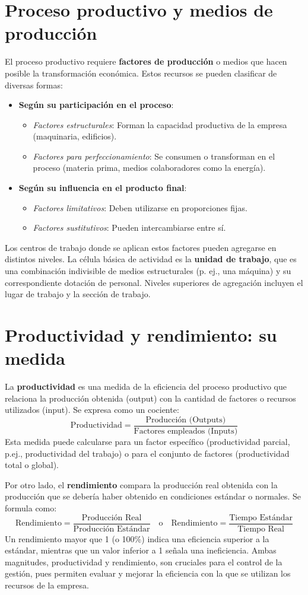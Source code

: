 \section{Proceso productivo y medios de producción}
El proceso productivo requiere \textbf{factores de producción} o medios que hacen posible la transformación económica. Estos recursos se pueden clasificar de diversas formas:
\begin{itemize}
    \item \textbf{Según su participación en el proceso}:
        \begin{itemize}
            \item \textit{Factores estructurales}: Forman la capacidad productiva de la empresa (maquinaria, edificios).
            \item \textit{Factores para perfeccionamiento}: Se consumen o transforman en el proceso (materia prima, medios colaboradores como la energía).
        \end{itemize}
    \item \textbf{Según su influencia en el producto final}:
        \begin{itemize}
            \item \textit{Factores limitativos}: Deben utilizarse en proporciones fijas.
            \item \textit{Factores sustitutivos}: Pueden intercambiarse entre sí.
        \end{itemize}
\end{itemize}
Los centros de trabajo donde se aplican estos factores pueden agregarse en distintos niveles. La célula básica de actividad es la \textbf{unidad de trabajo}, que es una combinación indivisible de medios estructurales (p. ej., una máquina) y su correspondiente dotación de personal. Niveles superiores de agregación incluyen el lugar de trabajo y la sección de trabajo.

\section{Productividad y rendimiento: su medida}
La \textbf{productividad} es una medida de la eficiencia del proceso productivo que relaciona la producción obtenida (output) con la cantidad de factores o recursos utilizados (input). Se expresa como un cociente:
$$ \text{Productividad} = \frac{\text{Producción (Outputs)}}{\text{Factores empleados (Inputs)}} $$
Esta medida puede calcularse para un factor específico (productividad parcial, p.ej., productividad del trabajo) o para el conjunto de factores (productividad total o global).

Por otro lado, el \textbf{rendimiento} compara la producción real obtenida con la producción que se debería haber obtenido en condiciones estándar o normales. Se formula como:
$$ \text{Rendimiento} = \frac{\text{Producción Real}}{\text{Producción Estándar}} \quad \text{o} \quad \text{Rendimiento} = \frac{\text{Tiempo Estándar}}{\text{Tiempo Real}} $$
Un rendimiento mayor que 1 (o 100\%) indica una eficiencia superior a la estándar, mientras que un valor inferior a 1 señala una ineficiencia. Ambas magnitudes, productividad y rendimiento, son cruciales para el control de la gestión, pues permiten evaluar y mejorar la eficiencia con la que se utilizan los recursos de la empresa.
